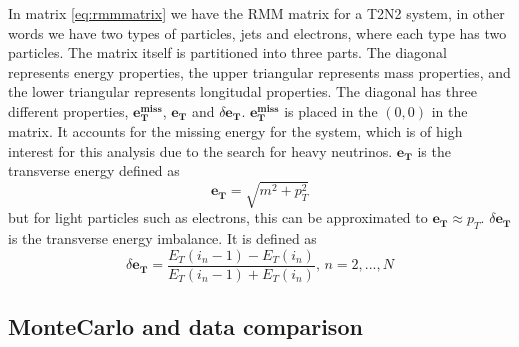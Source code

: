 In matrix \ref{eq:rmmmatrix} we have the RMM matrix for a T2N2 system, in other words we have two types of particles, jets and electrons, where each type has
two particles. The matrix itself is partitioned into three parts. The diagonal represents energy properties, the upper triangular represents mass properties, 
and the lower triangular represents longitudal properties. The diagonal has three different properties, $\boldsymbol{e_T^{miss}}$, $\boldsymbol{e_T}$ and $\delta\boldsymbol{e_T}$. 
$\boldsymbol{e_T^{miss}}$ is placed in the $(0,0)$ in the matrix. It accounts for the missing energy for the system, which is of high interest for this analysis due to
the search for heavy neutrinos. $\boldsymbol{e_T}$ is the transverse energy defined as 
\begin{equation*}
    \boldsymbol{e_T} = \sqrt{m^2 + p_T^2}
\end{equation*}
but for light particles such as electrons, this can be approximated to $\boldsymbol{e_T} \approx p_T$. $\delta\boldsymbol{e_T}$ is the transverse energy imbalance.
It is defined as 
\begin{equation*}
    \delta\boldsymbol{e_T} = \frac{E_T(i_n-1) - E_T(i_n)}{E_T(i_n-1) + E_T(i_n)}, \, n = 2, ..., N
\end{equation*}

\subsection*{MonteCarlo and data comparison}